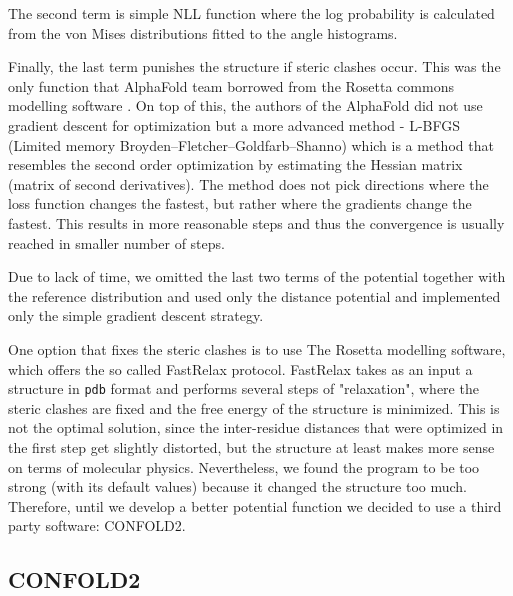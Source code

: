 The second term is simple NLL function where the log probability is calculated from the von Mises distributions fitted to the angle histograms.

Finally, the last term punishes the structure if steric clashes occur. This was the only function that AlphaFold team borrowed from the Rosetta commons modelling software \cite{rosettacommons}. On top of this, the authors of the AlphaFold did not use gradient descent for optimization but a more advanced method - L-BFGS (Limited memory Broyden–Fletcher–Goldfarb–Shanno) which is a method that resembles the second order optimization by estimating the Hessian matrix (matrix of second derivatives). The method does not pick directions where the loss function changes the fastest, but rather where the gradients change the fastest. This results in more reasonable steps and thus the convergence is usually reached in smaller number of steps. %

Due to lack of time, we omitted the last two terms of the potential together with the reference distribution and used only the distance potential and implemented only the simple gradient descent strategy. 

One option that fixes the steric clashes is to use The Rosetta modelling software, which offers the so called FastRelax protocol. 
FastRelax takes as an input a structure in \texttt{pdb} format and performs several steps of "relaxation", where the steric clashes are fixed and the free energy of the structure is minimized. 
This is not the optimal solution, since the inter-residue distances that were optimized in the first step get slightly distorted, but the structure at least makes more sense on terms of molecular physics. 
Nevertheless, we found the program to be too strong (with its default values) because it changed the structure too much.
Therefore, until we develop a better potential function we decided to use a third party software: CONFOLD2. 

\subsection{CONFOLD2}


